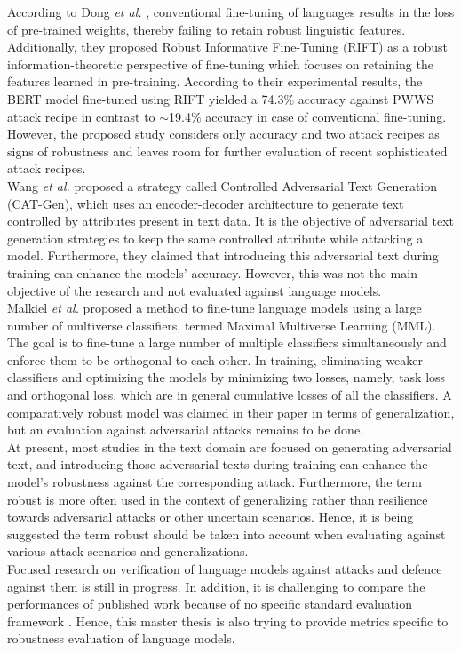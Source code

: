 \documentclass[%
	BCOR=8mm, %
	DIV=12,
	toc=bibliography, %
	toc=listof, %
	oneside, %
	egregdoesnotlikesansseriftitles, %
	]{scrbook}
\begin{document}
According to Dong \textit{et al.} \cite{dong_how_2021}, conventional fine-tuning of languages results in the loss of pre-trained weights, thereby failing to retain robust linguistic features. Additionally, they proposed Robust Informative Fine-Tuning (RIFT) as a robust information-theoretic perspective of fine-tuning which focuses on retaining the features learned in pre-training. According to their experimental results, the BERT model fine-tuned using RIFT yielded a 74.3\% accuracy against PWWS attack recipe in contrast to  $\sim$19.4\% accuracy in case of conventional fine-tuning. However, the proposed study considers only accuracy and two attack recipes as signs of robustness and leaves room for further evaluation of recent sophisticated attack recipes.\\
Wang \textit{et al.} \cite{wang_cat-gen_2020} proposed a strategy called Controlled Adversarial Text Generation (CAT-Gen), which uses an encoder-decoder architecture to generate text controlled by attributes present in text data. It is the objective of adversarial text generation strategies to keep the same controlled attribute while attacking a model. Furthermore, they claimed that introducing this adversarial text during training can enhance the models' accuracy. However, this was not the main objective of the research and not evaluated against language models.\\
 Malkiel \textit{et al.} \cite{malkiel_mml_2019} proposed a method to fine-tune language models using a large number of multiverse classifiers, termed Maximal Multiverse Learning (MML). The goal is to fine-tune a large number of multiple classifiers simultaneously and enforce them to be orthogonal to each other. In training, eliminating weaker classifiers and optimizing the models by minimizing two losses, namely, task loss and orthogonal loss, which are in general cumulative losses of all the classifiers. A comparatively robust model was claimed in their paper in terms of generalization, but an evaluation against adversarial attacks remains to be done.\\
At present, most studies in the text domain are focused on generating adversarial text, and introducing those adversarial texts during training can enhance the model's robustness against the corresponding attack.  Furthermore, the term robust is more often used in the context of generalizing rather than resilience towards adversarial attacks or other uncertain scenarios. Hence, it is being suggested the term robust should be taken into account when evaluating against various attack scenarios and generalizations. \\
Focused research on verification of language models against attacks and defence against them is still in progress. In addition, it is challenging to compare the performances of published work because of no specific standard evaluation framework \cite{moradi_evaluating_2021-1}. Hence, this master thesis is also trying to provide metrics specific to robustness evaluation of language models.
\end{document}
